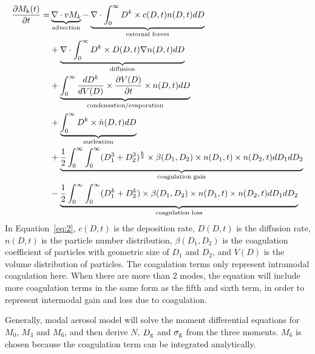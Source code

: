 \documentclass[12pt, fullpage]{uiucthesis2009}
\begin{document}
		\begin{align}\label{eq:2}
		\begin{split}
		\frac{\partial M_\text{k}(t)}{\partial t} = &
		\underbrace{\nabla \cdot vM_k}_\text{\clap{advection}} - \underbrace{\nabla \cdot \int_{0}^{\infty}D^k\times c(D,t)n(D,t)dD}_\text{\clap{external forces}} \\
		&+ \underbrace{\nabla \cdot \int_{0}^{\infty}D^k\times D(D,t)\nabla n(D,t)dD}_\text{\clap{diffusion}} \\
		&+ \underbrace{\int_{0}^{\infty}\frac{dD^k}{dV(D)}\times \frac{\partial V(D)}{\partial t}\times n(D,t)dD}_\text{\clap{condensation/evaporation}} \\
		&+ \underbrace{\int_{0}^{\infty}D^k\times \dot n(D,t)dD}_\text{\clap{nucleation}} \\
		&+ \underbrace{\frac{1}{2}\int_{0}^{\infty}\int_{0}^{\infty}
			(D_{1}^3+D_{2}^3)^{\frac{k}{3}}\times \beta(D_{1},D_2)\times n(D_1, t)\times n(D_2,t) dD_1dD_2}_\text{\clap{coagulation gain}} \\
		&-\underbrace{\frac{1}{2}\int_{0}^{\infty}\int_{0}^{\infty}
			(D_{1}^k+D_{2}^k)\times \beta(D_{1},D_2)\times n(D_1, t)\times n(D_2,t) dD_1dD_2}_\text{\clap{coagulation loss}}
		\end{split}
		\end{align}
		In Equation~\ref{eq:2}, $c(D,t)$ is the deposition rate, $D(D,t)$ is the diffusion rate, $n(D,t)$ is the particle number distribution, $\beta(D_{1},D_2)$ is the coagulation coefficient of particles with geometric size of $D_1$ and $D_2$, and $V(D)$ is the volume distribution of particles. The coagulation terms only represent intramodal coagulation here. When there are more than 2 modes, the equation will include more coagulation terms in the same form as the fifth and sixth term, in order to represent intermodal gain and loss due to coagulation.
		
		Generally, modal aerosol model will solve the moment differential equations for $M_0$, $M_3$ and $M_6$, and then derive $N$, $D_{\rm g}$ and $\sigma_{\rm g}$ from the three moments. $M_6$ is chosen because the coagulation term can be integrated analytically.
		 
\end{document}
